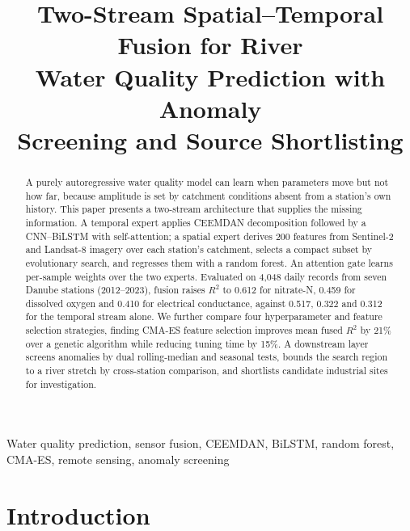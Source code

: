\documentclass[conference]{IEEEtran}
\begin{document}
\title{Two-Stream Spatial--Temporal Fusion for River\\
Water Quality Prediction with Anomaly\\
Screening and Source Shortlisting}

\author{
}

\maketitle

\begin{abstract}
A purely autoregressive water quality model can learn when parameters move but
not how far, because amplitude is set by catchment conditions absent from a
station's own history. This paper presents a two-stream architecture that
supplies the missing information. A temporal expert applies CEEMDAN
decomposition followed by a CNN--BiLSTM with self-attention; a spatial expert
derives 200 features from Sentinel-2 and Landsat-8 imagery over each station's
catchment, selects a compact subset by evolutionary search, and regresses them
with a random forest. An attention gate learns per-sample weights over the two
experts. Evaluated on 4{,}048 daily records from seven Danube stations
(2012--2023), fusion raises $R^2$ to 0.612 for nitrate-N, 0.459 for dissolved
oxygen and 0.410 for electrical conductance, against 0.517, 0.322 and 0.312 for
the temporal stream alone. We further compare four hyperparameter and feature
selection strategies, finding CMA-ES feature selection improves mean fused
$R^2$ by 21\% over a genetic algorithm while reducing tuning time by 15\%. A
downstream layer screens anomalies by dual rolling-median and seasonal tests,
bounds the search region to a river stretch by cross-station comparison, and
shortlists candidate industrial sites for investigation.
\end{abstract}

\begin{IEEEkeywords}
Water quality prediction, sensor fusion, CEEMDAN, BiLSTM, random forest,
CMA-ES, remote sensing, anomaly screening
\end{IEEEkeywords}

\section{Introduction}
\end{document}
